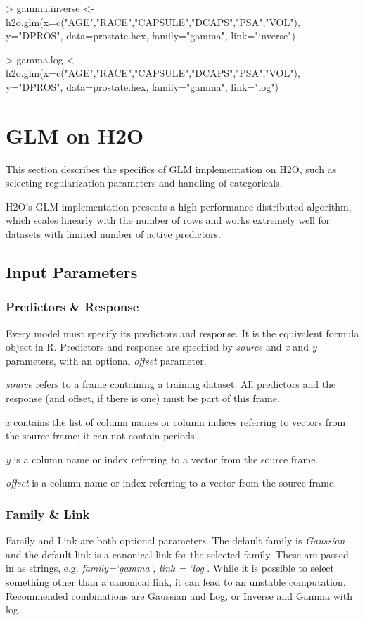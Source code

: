 \documentclass[11pt]{article}
\begin{document}
\begin{spverbatim}
> gamma.inverse <- h2o.glm(x=c("AGE","RACE","CAPSULE","DCAPS","PSA","VOL"), y="DPROS", data=prostate.hex, family="gamma", link="inverse")

> gamma.log <- h2o.glm(x=c("AGE","RACE","CAPSULE","DCAPS","PSA","VOL"), y="DPROS", data=prostate.hex, family="gamma", link="log")
\end{spverbatim}



\section{GLM on H2O}
This section describes the specifics of GLM implementation on H2O, such as selecting regularization parameters and handling of categoricals. 

H2O's GLM implementation presents a high-performance distributed algorithm, which scales linearly with the number of rows and works extremely well for datasets with limited number of active predictors. 

\subsection{Input Parameters}
\subsubsection{Predictors \& Response}
Every model must specify its predictors and response. It is the equivalent formula object in R. Predictors and response are specified by \textit{source} and \textit{x} and \textit{y} parameters, with an optional \textit{offset} parameter. 

\textit{source} refers to a frame containing a training dataset. All predictors and the response (and offset, if there is one) must be part of this frame.

\textit{x} contains the list of column names or column indices referring to vectors from the source frame; it can not contain periods.

\textit{y} is a column name or index referring to a vector from the source frame.

\textit{offset} is a column name or index referring to a vector from the source frame.
  
\subsubsection{Family \& Link}
Family and Link are both optional parameters. The default family is \textit{Gaussian} and the default link is a canonical link for the selected family. These are passed in as strings, e.g. \textit{family=`gamma', link = `log'}.
While it is possible to select something other than a canonical link, it can lead to an unstable computation. Recommended combinations are Gaussian and Log, or Inverse and Gamma with log.  
\end{document}
